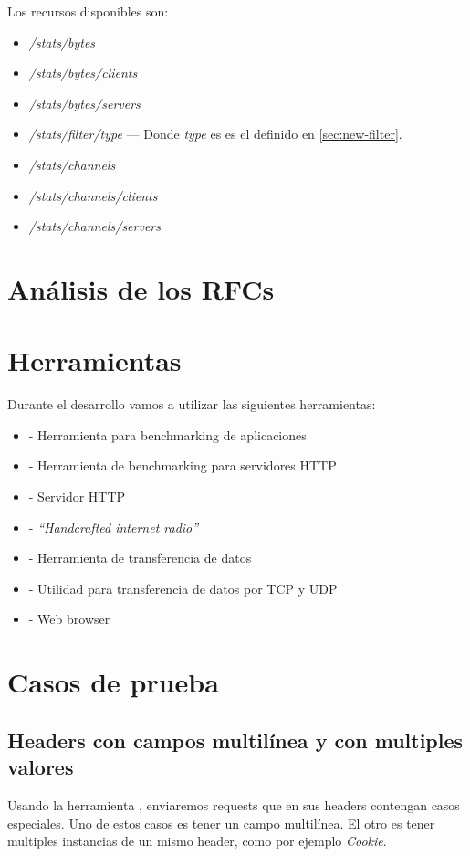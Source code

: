 \documentclass[11pt,a4paper,titlepage]{article}
\begin{document}
Los recursos disponibles son:
\begin{itemize}
    \item \textit{/stats/bytes}
    \item \textit{/stats/bytes/clients}
    \item \textit{/stats/bytes/servers}
    \item \textit{/stats/filter/type} --- Donde \textit{type} es es el definido en \ref{sec:new-filter}.
    \item \textit{/stats/channels}
    \item \textit{/stats/channels/clients}
    \item \textit{/stats/channels/servers}
\end{itemize}

\section{Análisis de los RFCs}

\section{Herramientas}
    Durante el desarrollo vamos a utilizar las siguientes herramientas:
    \begin{itemize}
        \item {} - Herramienta para benchmarking de aplicaciones
        \item {} - Herramienta de benchmarking para servidores HTTP
        \item {} - Servidor HTTP
        \item {} - \emph{``Handcrafted internet radio''}
        \item {} - Herramienta de transferencia de datos
        \item {} - Utilidad para transferencia de datos por TCP y UDP
        \item {} - Web browser
    \end{itemize}

\section{Casos de prueba}
\subsection{Headers con campos multilínea y con multiples valores}
Usando la herramienta , enviaremos requests que en sus headers contengan casos especiales.
Uno de estos casos es tener un campo multilínea.
El otro es tener multiples instancias de un mismo header, como por ejemplo \textit{Cookie}.
\end{document}
